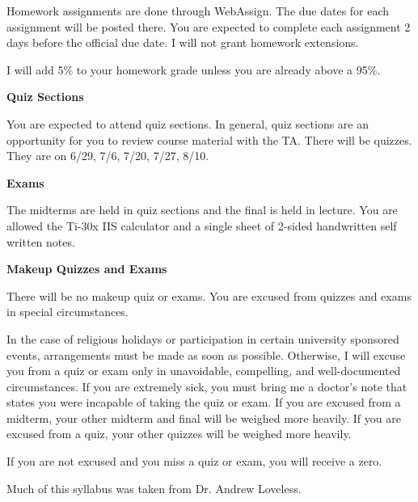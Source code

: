 \documentclass{article}
\begin{document}
Homework assignments are done through WebAssign. The due dates for each
assignment will be posted there. You are expected to complete each assignment 2
days before the official due date. I will not grant homework extensions.

I will add 5\% to your homework grade unless you are already above a 95\%.

\textbf{Quiz Sections}

You are expected to attend quiz sections. In general, quiz sections are an
opportunity for you to review course material with the TA. There will be
quizzes. They are on 6/29, 7/6, 7/20, 7/27, 8/10.

\textbf{Exams}

The midterms are held in quiz sections and the final is held in lecture. You
are allowed the Ti-30x IIS calculator and a single sheet of 2-sided handwritten
self written notes.

\textbf{Makeup Quizzes and Exams}

There will be no makeup quiz or exams. You are excused from quizzes and exams
in special circumstances.

In the case of religious holidays or participation in certain university
sponsored events, arrangements must be made as soon as possible. Otherwise, I
will excuse you from a quiz or exam only in unavoidable, compelling, and
well-documented circumstances. If you are extremely sick, you must bring me a
doctor's note that states you were incapable of taking the quiz or exam. If you
are excused from a midterm, your other midterm and final will be weighed more
heavily. If you are excused from a quiz, your other quizzes will be weighed
more heavily.

If you are not excused and you miss a quiz or exam, you will receive a zero.


Much of this syllabus was taken from Dr. Andrew Loveless.
\end{document}

